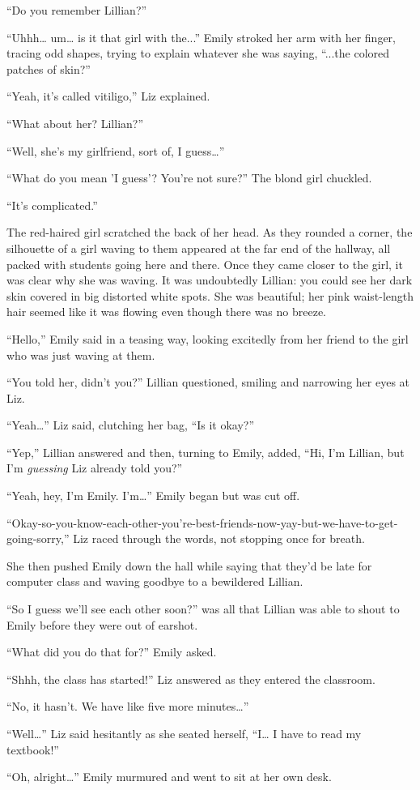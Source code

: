 “Do you remember Lillian?”

“Uhhh… um… is it that girl with the...” Emily stroked her arm with her finger, tracing odd shapes, trying to explain whatever she was saying, “...the colored patches of skin?”

“Yeah, it's called vitiligo,” Liz explained.

“What about her? Lillian?”

“Well, she's my girlfriend, sort of, I guess…”

“What do you mean 'I guess'? You're not sure?” The blond girl chuckled.

“It's complicated.”

The red-haired girl scratched the back of her head. As they rounded a corner, the silhouette of a girl waving to them appeared at the far end of the hallway, all packed with students going here and there. Once they came closer to the girl, it was clear why she was waving. It was undoubtedly Lillian: you could see her dark skin covered in big distorted white spots. She was beautiful; her pink waist-length hair seemed like it was flowing even though there was no breeze.

“Hello,” Emily said in a teasing way, looking excitedly from her friend to the girl who was just waving at them.

“You told her, didn't you?” Lillian questioned, smiling and narrowing her eyes at Liz.

“Yeah…” Liz said, clutching her bag, “Is it okay?”

“Yep,” Lillian answered and then, turning to Emily, added, “Hi, I'm Lillian, but I'm \textit{guessing} Liz already told you?”

“Yeah, hey, I'm Emily. I'm…” Emily began but was cut off.

“Okay-so-you-know-each-other-you're-best-friends-now-yay-but-we-have-to-get-going-sorry,” Liz raced through the words, not stopping once for breath.

She then pushed Emily down the hall while saying that they'd be late for computer class and waving goodbye to a bewildered Lillian.

“So I guess we'll see each other soon?” was all that Lillian was able to shout to Emily before they were out of earshot.

“What did you do that for?” Emily asked.

“Shhh, the class has started!” Liz answered as they entered the classroom.

“No, it hasn't. We have like five more minutes…”

“Well…” Liz said hesitantly as she seated herself, “I… I have to read my textbook!”

“Oh, alright…” Emily murmured and went to sit at her own desk.